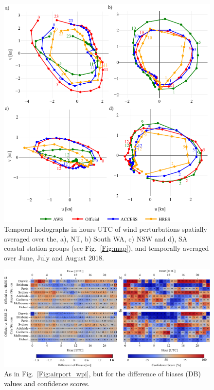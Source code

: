 \documentclass{ametsoc}
\begin{document}
\begin{figure}
\centering
\includegraphics[width=33pc]{clim_hodo_alt.pdf}
\caption{Temporal hodographs in hours UTC of wind perturbations spatially averaged over the, a), NT, b) South WA, c) NSW and d), SA coastal station groups (see Fig.~\ref{Fig:map}), and temporally averaged over June, July and August 2018.}
\label{Fig:clim_hodo}
\end{figure}

\begin{figure}
\centering
\includegraphics[width=39pc]{airport_cwpi.pdf}
\caption{As in Fig.~\ref{Fig:airport_wpi}, but for the difference of biases (DB) values and confidence scores.}
\label{Fig:airport_cwpi}
\end{figure}
\end{document}
